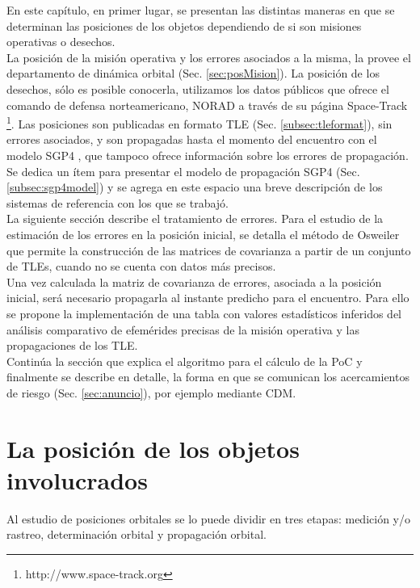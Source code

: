 En este cap\'itulo, en primer lugar, se presentan las distintas maneras en que se determinan las posiciones de los objetos dependiendo de si son misiones operativas o desechos.\\
La posici\'on de la misi\'on operativa y los errores asociados a la misma, la provee el departamento de din\'amica orbital (Sec. \ref{sec:posMision}).
La posici\'on de los desechos, s\'olo es posible conocerla, utilizamos los datos p\'ublicos que ofrece el comando de defensa norteamericano, \ac{NORAD} a trav\'es de su p\'agina Space-Track {\footnote{http://www.space-track.org}}. Las posiciones son publicadas en formato \ac{TLE} (Sec. \ref{subsec:tleformat}), sin errores asociados, y son propagadas hasta el momento del encuentro con el modelo SGP4  \citep{hoots1980models}, que tampoco ofrece informaci\'on sobre los errores de propagaci\'on. Se dedica un \'item para presentar el modelo de propagaci\'on SGP4 (Sec. \ref{subsec:sgp4model}) y se agrega en este espacio una breve descripci\'on de los sistemas de referencia con los que se trabaj\'o.\\

La siguiente secci\'on describe el tratamiento de errores. Para el estudio de la estimaci\'on de los errores en la posici\'on inicial, se detalla el m\'etodo de Osweiler \citep{osweiler} que permite la construcci\'on de las matrices de covarianza a partir de un conjunto de TLEs, cuando no se cuenta con datos m\'as precisos.\\
Una vez calculada la matriz de covarianza de errores, asociada a la posici\'on inicial, ser\'a necesario propagarla al instante predicho para el encuentro. Para ello se propone la implementaci\'on de una tabla con valores estad\'isticos inferidos del an\'alisis comparativo de efem\'erides precisas de la misi\'on operativa y las propagaciones de los TLE.\\
Contin\'ua la secci\'on que explica el algoritmo para el c\'alculo de la PoC y finalmente se describe en detalle, la forma en que se comunican los acercamientos de riesgo (Sec. \ref{sec:anuncio}), por ejemplo mediante \ac{CDM}.


\section{La posici\'on de los objetos involucrados}{\label{sec:posMision}}
Al estudio de posiciones orbitales se lo puede dividir en tres etapas: medici\'on y/o rastreo, determinaci\'on orbital y propagaci\'on orbital.

